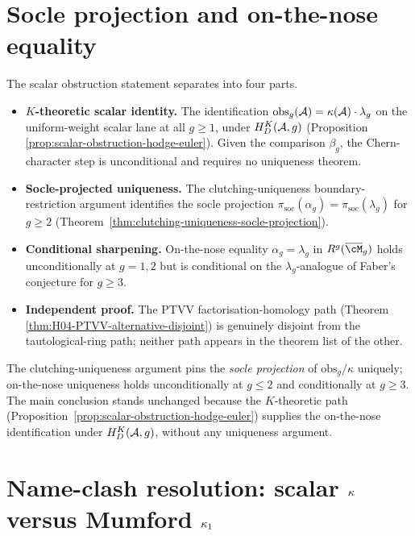 \section{Socle projection and on-the-nose equality}
\label{sec:socle-projection-equality}

The scalar obstruction statement separates into four parts.

\begin{itemize}
\item \textbf{$K$-theoretic scalar identity.} The identification
$\mathrm{obs}_g(\mathcal{A}) = \kappa(\mathcal{A})\cdot\lambda_g$ on the
uniform-weight scalar lane at all $g \geq 1$, under
$H_D^K(\mathcal{A},g)$ (Proposition~%
\ref{prop:scalar-obstruction-hodge-euler}). Given the comparison
$\beta_g$, the Chern-character step is unconditional and requires
no uniqueness theorem.
\item \textbf{Socle-projected uniqueness.} The clutching-uniqueness
boundary-restriction argument identifies the socle projection
$\pi_{\mathrm{soc}}(\alpha_g) = \pi_{\mathrm{soc}}(\lambda_g)$
for $g \geq 2$ (Theorem~\ref{thm:clutching-uniqueness-socle-projection}).
\item \textbf{Conditional sharpening.}
On-the-nose equality $\alpha_g = \lambda_g$ in $R^g(\overline{\cM}_g)$
holds unconditionally at $g = 1, 2$ but is conditional on the
$\lambda_g$-analogue of Faber's conjecture for $g \geq 3$.
\item \textbf{Independent proof.} The PTVV
factorisation-homology path (Theorem~%
\ref{thm:H04-PTVV-alternative-disjoint}) is genuinely disjoint
from the tautological-ring path; neither path appears in the
theorem list of the other.
\end{itemize}

\begin{remark}
\label{rem:clutching-upstream-impact}

The clutching-uniqueness argument
pins the \emph{socle projection} of $\mathrm{obs}_g/\kappa$ uniquely;
on-the-nose uniqueness holds unconditionally at $g \leq 2$ and
conditionally at $g \geq 3$. The main conclusion stands
unchanged because the $K$-theoretic path
(Proposition~\ref{prop:scalar-obstruction-hodge-euler}) supplies
the on-the-nose identification under $H_D^K(\mathcal{A},g)$, without any
uniqueness argument.
\end{remark}

\section{Name-clash resolution: scalar $\kappa$ versus Mumford $\kappa_{1}$}
\label{sec:kappa-name-clash-resolution}

